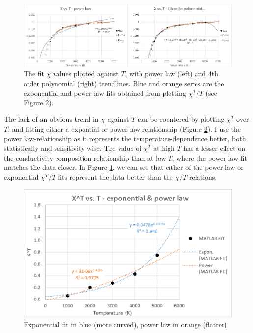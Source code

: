 \begin{figure}[h]
  \includegraphics[width=\linewidth]{Figures/draft_XT.png}
  \caption{The fit $\chi$ values plotted against $T$, with power law (left) and 4th order polynomial (right) trendlines. Blue and orange series are the exponential and power law fits obtained from plotting $\chi^T/T$ (see Figure \ref{fig:draft_xtt}).}
  \label{fig:draft_xt}
\end{figure}

The lack of an obvious trend in $\chi$ against $T$ can be countered by plotting $\chi^T$ over $T$, and fitting either a expontial or power law relationship (Figure \ref{fig:draft_xtt}). I use the power law-relationship as it represents the temperature-dependence better, both statistically and sensitivity-wise. The value of $\chi^T$ at high $T$ has a lesser effect on the conductivity-composition relationship than at low $T$, where the power law fit matches the data closer. In Figure \ref{fig:draft_xt}, we can see that either of the power law or exponential $\chi^T/T$ fits represent the data better than the $\chi/T$ relations.\\ 

\begin{figure}[h]
  \includegraphics[width=\linewidth]{Figures/draft_XTT.png}
  \caption{Exponential fit in blue (more curved), power law in orange (flatter)}
  \label{fig:draft_xtt}
\end{figure}



